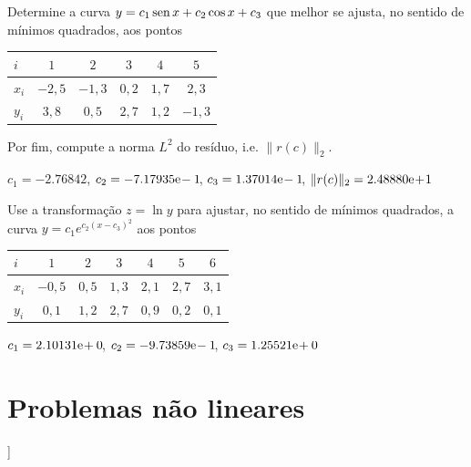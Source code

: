 \begin{exer}
  Determine a curva $y = c_1\operatorname{sen} x + c_2\cos x + c_3$ que melhor se ajusta, no sentido de mínimos quadrados, aos pontos
  \begin{center}
    \begin{tabular}{l|ccccc}
      $i$ & $1$ & $2$ & $3$ & $4$ & $5$ \\\hline
      $x_i$ & $-2,5$ & $-1,3$ & $0,2$ & $1,7$ & $2,3$\\
      $y_i$ & $3,8$ & $0,5$ & $2,7$ & $1,2$ & $-1,3$\\\hline
    \end{tabular}
  \end{center}
Por fim, compute a norma $L^2$ do resíduo, i.e. $\|r(c)\|_2$.
\end{exer}
\begin{resp}
  $c_1 = -2.76842$, $c_2 = -7.17935\mathrm{e}\!-1\!$, $c_3 = 1.37014\mathrm{e}\!-1\!$, $\|r(c)\|_2 = 2.48880\mathrm{e}\!+\!1$
\end{resp}

\begin{exer}
  Use a transformação $z = \ln y$ para ajustar, no sentido de mínimos quadrados, a curva $y = c_1e^{c_2(x-c_3)^2}$ aos pontos
  \begin{center}
    \begin{tabular}{l|cccccc}
      $i$ & $1$ & $2$ & $3$ & $4$ & $5$ & $6$ \\\hline
      $x_i$ & $-0,5$ & $0,5$ & $1,3$ & $2,1$ & $2,7$ & $3,1$ \\
      $y_i$ & $0,1$ & $1,2$ & $2,7$ & $0,9$ & $0,2$ & $0,1$ \\\hline
    \end{tabular}
  \end{center}
\end{exer}
\begin{resp}
  $c_1 = 2.10131\mathrm{e}\!+0\!$, $c_2 = -9.73859\mathrm{e}\!-1\!$, $c_3 = 1.25521\mathrm{e}\!+0\!$
\end{resp}
   
\section{Problemas não lineares}\label{cap_ajuste_sec_prob_nlin}

\begin{flushleft}
  [[tag:revisar]]
\end{flushleft}

